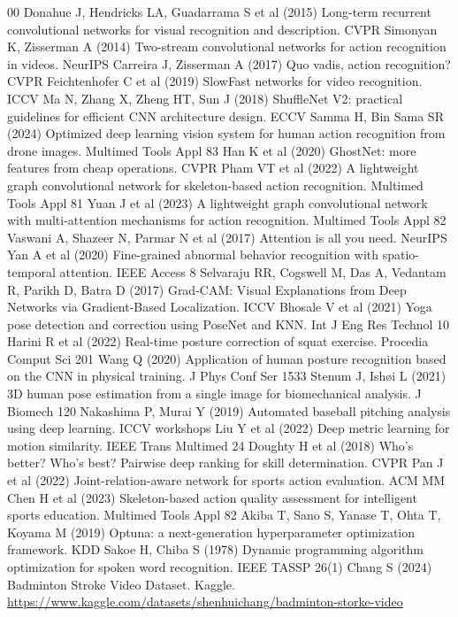 \documentclass[pdflatex,sn-mathphys-num]{sn-jnl}%
\theoremstyle{thmstyleone}%
\theoremstyle{thmstyletwo}%
\theoremstyle{thmstylethree}%
\begin{document}
\begin{thebibliography}{00}
 Donahue J, Hendricks LA, Guadarrama S et al (2015) Long-term recurrent convolutional networks for visual recognition and description. CVPR
 Simonyan K, Zisserman A (2014) Two-stream convolutional networks for action recognition in videos. NeurIPS
 Carreira J, Zisserman A (2017) Quo vadis, action recognition? CVPR
 Feichtenhofer C et al (2019) SlowFast networks for video recognition. ICCV
 Ma N, Zhang X, Zheng HT, Sun J (2018) ShuffleNet V2: practical guidelines for efficient CNN architecture design. ECCV
 Samma H, Bin Sama SR (2024) Optimized deep learning vision system for human action recognition from drone images. Multimed Tools Appl 83
 Han K et al (2020) GhostNet: more features from cheap operations. CVPR
 Pham VT et al (2022) A lightweight graph convolutional network for skeleton-based action recognition. Multimed Tools Appl 81
 Yuan J et al (2023) A lightweight graph convolutional network with multi-attention mechanisms for action recognition. Multimed Tools Appl 82
 Vaswani A, Shazeer N, Parmar N et al (2017) Attention is all you need. NeurIPS
 Yan A et al (2020) Fine-grained abnormal behavior recognition with spatio-temporal attention. IEEE Access 8
 Selvaraju RR, Cogswell M, Das A, Vedantam R, Parikh D, Batra D (2017) Grad-CAM: Visual Explanations from Deep Networks via Gradient-Based Localization. ICCV
 Bhosale V et al (2021) Yoga pose detection and correction using PoseNet and KNN. Int J Eng Res Technol 10
 Harini R et al (2022) Real-time posture correction of squat exercise. Procedia Comput Sci 201
 Wang Q (2020) Application of human posture recognition based on the CNN in physical training. J Phys Conf Ser 1533
 Stenum J, Ish\o i L (2021) 3D human pose estimation from a single image for biomechanical analysis. J Biomech 120
 Nakashima P, Murai Y (2019) Automated baseball pitching analysis using deep learning. ICCV workshops
 Liu Y et al (2022) Deep metric learning for motion similarity. IEEE Trans Multimed 24
 Doughty H et al (2018) Who's better? Who's best? Pairwise deep ranking for skill determination. CVPR
 Pan J et al (2022) Joint-relation-aware network for sports action evaluation. ACM MM
 Chen H et al (2023) Skeleton-based action quality assessment for intelligent sports education. Multimed Tools Appl 82
 Akiba T, Sano S, Yanase T, Ohta T, Koyama M (2019) Optuna: a next-generation hyperparameter optimization framework. KDD
 Sakoe H, Chiba S (1978) Dynamic programming algorithm optimization for spoken word recognition. IEEE TASSP 26(1)
 Chang S (2024) Badminton Stroke Video Dataset. Kaggle. \url{https://www.kaggle.com/datasets/shenhuichang/badminton-storke-video}

\end{thebibliography}
\end{document}
